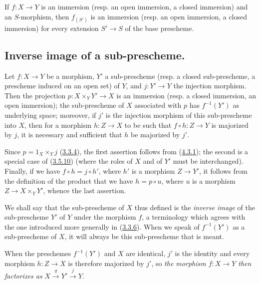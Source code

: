 \begin{corollary}[4.3.2]
\label{I.4.3.2}
If $f:X\to Y$ is an immersion (\textup{resp.} an open immersion, a closed
immersion) and an $S$-morphism, then $f_{(S')}$ is an immersion (\textup{resp.} an open
immersion, a closed immersion) for every extension $S'\to S$ of the base
prescheme.
\end{corollary}

\subsection{Inverse image of a sub-prescheme.}
\label{subsection:I.4.4}

\begin{proposition}[4.4.1]
\label{I.4.4.1}
Let $f:X\to Y$ be a morphism, $Y'$ a sub-prescheme (\textup{resp.} a
closed sub-prescheme, a prescheme induced on an open set) of $Y$, and
$j:Y'\to Y$ the injection morphism. Then the projection $p:X\times_Y Y'\to X$
is an immersion (\textup{resp.} a closed immersion, an open immersion); the
sub-prescheme of $X$ associated with $p$ has $f^{-1}(Y')$ as underlying space;
moreover, if $j'$ is the injection morphism of this sub-prescheme into $X$,
then for a morphism $h:Z\to X$ to be such that $f\circ h:Z\to Y$ is majorized
by $j$, it is necessary and sufficient that $h$ be majorized by $j'$.
\end{proposition}

Since $p=1_X\times_Y j$ (\hyperref[I.3.3.4]{3.3.4}), the first assertion
follows from (\hyperref[I.4.3.1]{4.3.1}); the second is a special case
of (\hyperref[I.3.5.10]{3.5.10}) (where the roles of $X$ and
of $Y'$ must be interchanged). Finally, if we have $f\circ h=j\circ h'$, where
$h'$ is a morphism $Z\to Y'$, it follows from the definition of the product
that we have $h=p\circ u$, where $u$ is a morphism $Z\to X\times_Y Y'$, whence
the last assertion.

We shall say that the sub-prescheme of $X$ thus defined is the \emph{inverse
image} of the sub-prescheme $Y'$ of $Y$ under the morphism $f$, a terminology
which agrees with the one introduced
more generally in (\hyperref[I.3.3.6]{3.3.6}). When we
speak of $f^{-1}(Y')$ as a sub-prescheme of $X$, it will always be
this sub-prescheme that is meant.

When the preschemes $f^{-1}(Y')$ and $X$ are identical, $j'$ is
the identity and every morphism $h:Z\to X$ is therefore majorized by $j'$, so
\emph{the morphism $f:X\to Y$ then factorizes as}
$X\xrightarrow{g}Y'\xrightarrow{j}Y$.

